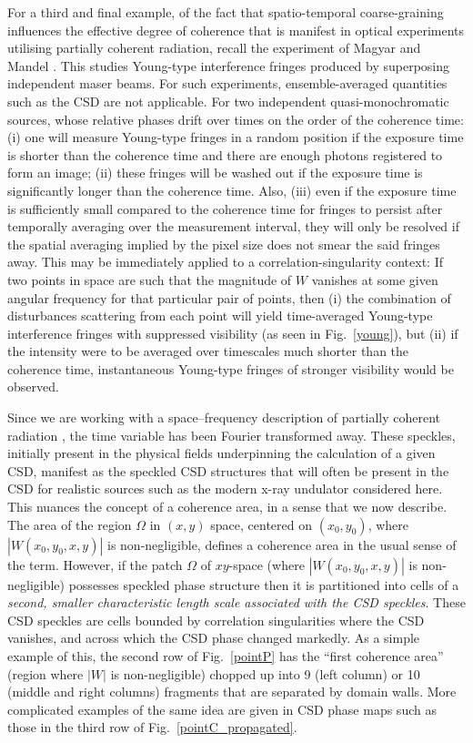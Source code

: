 \documentclass[%
 reprint,
 amsmath,amssymb,
 aps,
]{revtex4-1}
\begin{document}
For a third and final example, of the fact that spatio-temporal coarse-graining influences the effective degree of coherence that is manifest in optical experiments utilising partially coherent radiation, recall the experiment of Magyar and Mandel \cite{MagyarMandel1963}.  This studies Young-type interference fringes produced by superposing independent maser beams.  For such experiments, ensemble-averaged quantities such as the CSD are not applicable.  For two independent quasi-monochromatic sources, whose relative phases drift over times on the order of the coherence time: (i) one will measure Young-type fringes in a random position if the exposure time is shorter than the coherence time and there are enough photons registered to form an image; (ii) these fringes will be washed out if the exposure time is significantly longer than the coherence time.  Also, (iii) even if the exposure time is sufficiently small compared to the coherence time for fringes to persist after temporally averaging over the measurement interval, they will only be resolved if the spatial averaging implied by the pixel size does not smear the said fringes away.  This may be immediately applied to a correlation-singularity context: If two points in space are such that the magnitude of $W$ vanishes at some given angular frequency for that particular pair of points, then (i) the combination of disturbances scattering from each point will yield time-averaged Young-type interference fringes with suppressed visibility (as seen in Fig.~\ref{young}), but (ii) if the intensity were to be averaged over timescales much shorter than the coherence time, instantaneous Young-type fringes of stronger visibility would be observed.   

Since we are working with a space--frequency description of partially coherent radiation \cite{Wolf1982,mandel_wolf,wolf_thin_book}, the time variable has been Fourier transformed away.  These speckles, initially present in the physical fields underpinning the calculation of a given CSD, manifest as the speckled CSD structures that will often be present in the CSD for realistic sources such as the modern x-ray undulator considered here.  This nuances the concept of a coherence area, in a sense that we now describe.  The area of the region $\Omega$ in $(x,y)$ space, centered on $(x_0,y_0)$, where $|W(x_0,y_0,x,y)|$ is non-negligible, defines a coherence area in the usual sense of the term.  However, if the patch $\Omega$ of $xy$-space (where $|W(x_0,y_0,x,y)|$ is non-negligible) possesses speckled phase structure then it is partitioned into cells of a {\em second, smaller characteristic length scale associated with the CSD speckles}.  These CSD speckles are cells bounded by correlation singularities where the CSD vanishes, and across which the CSD phase changed markedly.  As a simple example of this, the second row of Fig.~\ref{pointP} has the ``first coherence area'' (region where $|W|$ is non-negligible) chopped up into 9 (left column) or 10 (middle and right columns) fragments that are separated by domain walls.  More complicated examples of the same idea are given in CSD phase maps such as those in the third row of Fig.~\ref{pointC_propagated}.
\end{document}
